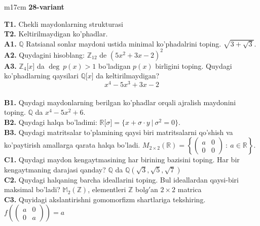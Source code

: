 \documentclass{article}
\begin{document}
\begin{tabular}{m{17cm}}
\textbf{28-variant}
\newline

\textbf{T1.} Chekli maydonlarning strukturasi \\
\textbf{T2.} Keltirilmaydigan ko'phadlar. \\
\textbf{A1.} \(\mathbb{Q}\) Ratsianal sonlar maydoni ustida minimal ko'phadalrini toping.
\(\sqrt{3 + \sqrt{3}}\). \\
\textbf{A2.} Quydagini hisoblang:
\(\mathbb{Z}_{12}\) de \(\left( 5x^{2} + 3x - 2 \right)^{2}\) \\
\textbf{A3.} \(\mathbb{Z}_{4}\lbrack x\rbrack\) da \(\deg\ p(x) > 1\) bo'ladigan \(p(x)\) birligini toping. Quydagi ko'phadlarning qaysilari \(\mathbb{Q\lbrack}x\rbrack\) da keltirilmaydigan?
\[x^{4} - 5x^{3} + 3x - 2\] \\
\textbf{B1.} Quydagi maydonlarning berilgan ko'phadlar orqali ajralish maydonini toping.
\(\mathbb{Q}\) da \(x^{4} - 5x^{2} + 6\). \\
\textbf{B2.} Quydagi halqa bo'ladimi:
\(\mathbb{R\lbrack}\sigma\rbrack = \{ x + \sigma \cdot y\ |\ \sigma^{2} = 0\}\). \\
\textbf{B3.} Quydagi matritsalar to'plamining qaysi biri matritsalarni qo'shish va ko'paytirish amallarga qarata halqa bo'ladi.
\(M_{2 \times 2}\mathbb{(R) =}\left\{ \begin{pmatrix}
a & 0 \\
0 & 0
\end{pmatrix}\ :\ a \in \mathbb{R} \right\}\). \\
\textbf{C1.} Quydagi maydon kengaytmasining har birining bazisini toping. Har bir kengaytmaning darajasi qanday?
\(\mathbb{Q}\) da \(\mathbb{Q}\left( \sqrt{3},\sqrt{5},\sqrt{7} \right)\) \\
\textbf{C2.} Quydagi halqaning barcha ideallarini toping. Bul ideallardan qaysi-biri maksimal bo'ladi?
\(\mathbb{M}_{2}\left( \mathbb{Z} \right)\), elementleri \(\mathbb{Z}\) bol\(g'\)an \(2 \times 2\) matrica \\
\textbf{C3.} Quyidagi akslantirishni gomomorfizm shartlariga tekshiring. \(f\left( \begin{pmatrix}
a & 0 \\
0 & a
\end{pmatrix} \right) = a\) \\

\end{tabular}
\vspace{1cm}
\end{document}
